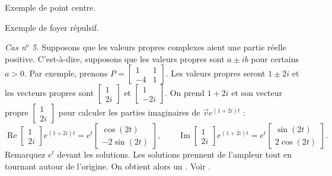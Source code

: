 \begin{myfig}
\parbox[t]{3.0in}{
 \capstart
 \caption{Exemple de point centre.\label{pln:ellipsesfig}}
}
\quad
\parbox[t]{3.0in}{
 \capstart
 \caption{Exemple de foyer répulsif.\label{pln:spiral-sourcefig}}
}
\end{myfig}

\medskip

\emph{Cas n$^o$ 5.} Supposons que les valeurs propres complexes aient une partie réelle positive. C’est-à-dire, supposons que les valeurs propres sont $a \pm ib$ pour certains $a > 0$.
Par exemple, prenons $P = 
\left[ \begin{smallmatrix} 1 & 1 \\ -4 & 1 \end{smallmatrix} \right]$.
Les valeurs propres seront $1\pm 2i$ et les vecteurs propres sont
$\left[ \begin{smallmatrix} 1 \\ 2i \end{smallmatrix} \right]$ et
$\left[ \begin{smallmatrix} 1 \\ -2i \end{smallmatrix} \right]$.  On prend
$1 + 2i$ et son vecteur propre
$\left[ \begin{smallmatrix} 1 \\ 2i \end{smallmatrix} \right]$ pour calculer les parties imaginaires de
$\vec{v} e^{(1+2i)t}$ :
\begin{equation*}
\operatorname{Re}
\begin{bmatrix} 1 \\ 2i \end{bmatrix} e^{(1+2i)t} =
e^t
\begin{bmatrix} \cos (2t) \\ -2 \sin (2t)  \end{bmatrix} ,
\qquad
\operatorname{Im}
\begin{bmatrix} 1 \\ 2i \end{bmatrix} e^{(1+2i)t} =
e^t
\begin{bmatrix} \sin (2t) \\ 2 \cos (2t) \end{bmatrix} .
\end{equation*}
Remarquez $e^t$ devant les solutions. Les solutions prennent de l'ampleur tout en tournant autour de l'origine. On obtient alors un \emph{}. Voir .

